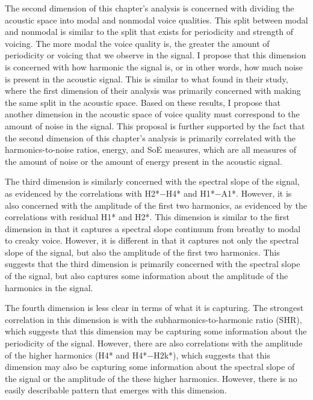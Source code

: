 The second dimension of this chapter's analysis is concerned with dividing the acoustic space into modal and nonmodal voice qualities. This split between modal and nonmodal is similar to the split that exists for periodicity and strength of voicing. The more modal the voice quality is, the greater the amount of periodicity or voicing that we observe in the signal. I propose that this dimension is concerned with how harmonic the signal is, or in other words, how much noise is present in the acoustic signal. This is similar to what \citet{keatingCrosslanguageAcousticSpace2023} found in their study, where the first dimension of their analysis was primarily concerned with making the same split in the acoustic space. Based on these results, I propose that another dimension in the acoustic space of voice quality must correspond to the amount of noise in the signal. This proposal is further supported by the fact that the second dimension of this chapter's analysis is primarily correlated with the harmonics-to-noise ratios, energy, and SoE measures, which are all measures of the amount of noise or the amount of energy present in the acoustic signal. 

The third dimension is similarly concerned with the spectral slope of the signal, as evidenced by the correlations with H2*$-$H4* and H1*$-$A1*. However, it is also concerned with the amplitude of the first two harmonics, as evidenced by the correlations with residual H1* and H2*. This dimension is similar to the first dimension in that it captures a spectral slope continuum from breathy to modal to creaky voice. However, it is different in that it captures not only the spectral slope of the signal, but also the amplitude of the first two harmonics. This suggests that the third dimension is primarily concerned with the spectral slope of the signal, but also captures some information about the amplitude of the harmonics in the signal.

The fourth dimension is less clear in terms of what it is capturing. The strongest correlation in this dimension is with the subharmonics-to-harmonic ratio (SHR), which suggests that this dimension may be capturing some information about the periodicity of the signal. However, there are also correlations with the amplitude of the higher harmonics (H4* and H4*$-$H2k*), which suggests that this dimension may also be capturing some information about the spectral slope of the signal or the amplitude of the these higher harmonics. However, there is no easily describable pattern that emerges with this dimension. 

